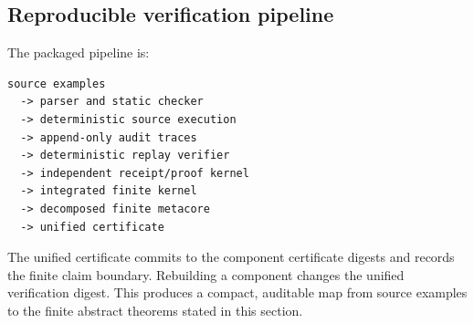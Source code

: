 \subsection{Reproducible verification pipeline}

The packaged pipeline is:
\begin{verbatim}
source examples
  -> parser and static checker
  -> deterministic source execution
  -> append-only audit traces
  -> deterministic replay verifier
  -> independent receipt/proof kernel
  -> integrated finite kernel
  -> decomposed finite metacore
  -> unified certificate
\end{verbatim}
The unified certificate commits to the component certificate digests and records the finite claim boundary.  Rebuilding a component changes the unified verification digest.  This produces a compact, auditable map from source examples to the finite abstract theorems stated in this section.
